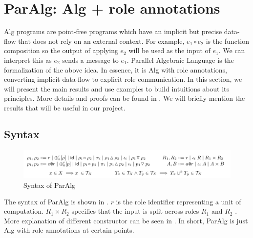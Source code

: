 \section{ParAlg: Alg + role annotations}
Alg programs are point-free programs which have an implicit but precise data-flow that does not rely on an external context. For example, $e_1 \circ e_2$ is the function composition so the output of applying $e_2$ will be used as the input of $e_1$. We can interpret this as $e_2$ sends a message to $e_1$. Parallel Algebraic Language is the formalization of the above idea. In essence, it is Alg with role annotations, converting implicit data-flow to explicit role communication. In this section, we will present the main results and use examples to build intuitions about its principles. More details and proofs can be found in \cite{AlgebraicMultipartyProtocol}. We will briefly mention the results that will be useful in our project.

\subsection{Syntax}
\begin{figure}[ht]
    \centering
    \includegraphics[width=\textwidth]{project/paralg.png}
    \caption{Syntax of ParAlg}
    \label{project:tab:paralg}
\end{figure}
The syntax of ParAlg is shown in . $r$ is the role identifier representing a unit of computation. $R_1 \times R_2$ specifies that the input is split across roles $R_1$ and $R_2$ \cite{AlgebraicMultipartyProtocol}. More explanation of different constructor can be seen in \cite{AlgebraicMultipartyProtocol}. In short, ParAlg is just Alg with role annotations at certain points. 


